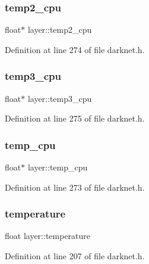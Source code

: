 \subsubsection{\texorpdfstring{temp2\_cpu}{temp2\_cpu}}
{\footnotesize\ttfamily float$\ast$ layer\+::temp2\+\_\+cpu}



Definition at line 274 of file darknet.\+h.

\mbox{\label{structlayer_a5576a957c950547134d305cb5e7ed42b}} 
\subsubsection{\texorpdfstring{temp3\_cpu}{temp3\_cpu}}
{\footnotesize\ttfamily float$\ast$ layer\+::temp3\+\_\+cpu}



Definition at line 275 of file darknet.\+h.

\mbox{\label{structlayer_a8a566c099cbba1da8bb7cc4d90643d0b}} 
\subsubsection{\texorpdfstring{temp\_cpu}{temp\_cpu}}
{\footnotesize\ttfamily float$\ast$ layer\+::temp\+\_\+cpu}



Definition at line 273 of file darknet.\+h.

\mbox{\label{structlayer_a965290dca263c7774c9e9b4272a43c49}} 
\subsubsection{\texorpdfstring{temperature}{temperature}}
{\footnotesize\ttfamily float layer\+::temperature}



Definition at line 207 of file darknet.\+h.

\mbox{\label{structlayer_a20c059ef419e2b863c67d4df87ec4488}} 
